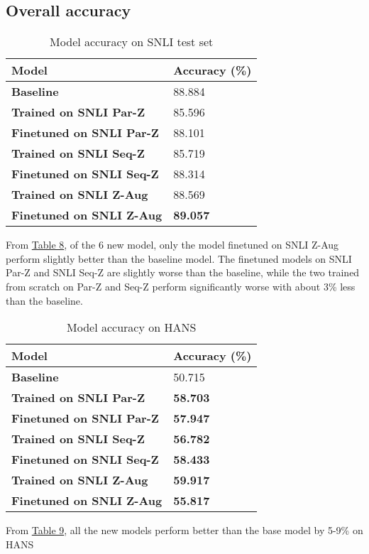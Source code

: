 \documentclass{article}
\begin{document}
\subsection{Overall accuracy}

\begin{table}[H]
\label{table8}
\caption{Model accuracy on SNLI test set}
\centering
\begin{tabular}{l l}
\hline
\textbf{Model}                   & \textbf{Accuracy (\%)} \\ \hline
\textbf{Baseline}                & 88.884                 \\
\textbf{Trained on SNLI Par-Z}   & 85.596                 \\
\textbf{Finetuned on SNLI Par-Z} & 88.101                 \\
\textbf{Trained on SNLI Seq-Z}   & 85.719                 \\
\textbf{Finetuned on SNLI Seq-Z} & 88.314                 \\
\textbf{Trained on SNLI Z-Aug}   & 88.569                 \\
\textbf{Finetuned on SNLI Z-Aug} & \textbf{89.057}                 \\ \hline
\end{tabular}
\end{table}

From \hyperref[table8]{Table 8}, of the 6 new model, only the model finetuned on SNLI Z-Aug perform slightly better than the baseline model.
The finetuned models on SNLI Par-Z and SNLI Seq-Z are slightly worse than the baseline, while the two trained from scratch on Par-Z and Seq-Z perform significantly worse with about 3\% less than the baseline.

\begin{table}[H]
    \label{table9}
    \caption{Model accuracy on HANS}
\centering
\begin{tabular}{l l}
\hline
\textbf{Model}                   & \textbf{Accuracy (\%)} \\ \hline
\textbf{Baseline}                & 50.715                 \\
\textbf{Trained on SNLI Par-Z}   & \textbf{58.703}                 \\
\textbf{Finetuned on SNLI Par-Z} & \textbf{57.947}                 \\
\textbf{Trained on SNLI Seq-Z}   & \textbf{56.782}                 \\
\textbf{Finetuned on SNLI Seq-Z} & \textbf{58.433}                 \\
\textbf{Trained on SNLI Z-Aug}   & \textbf{59.917}                 \\
\textbf{Finetuned on SNLI Z-Aug} & \textbf{55.817}                 \\ \hline
\end{tabular}

\end{table}
From \hyperref[table9]{Table 9}, all the new models perform better than the base model by 5-9\% on HANS
\end{document}
